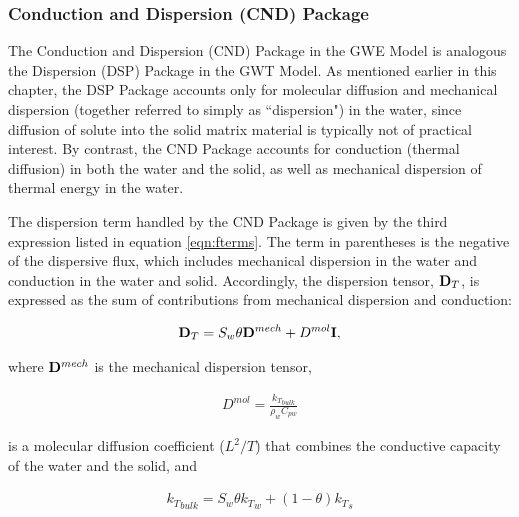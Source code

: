 \subsubsection{Conduction and Dispersion (CND) Package}

The Conduction and Dispersion (CND) Package in the GWE Model is analogous the Dispersion (DSP) Package in the GWT Model. As mentioned earlier in this chapter, the DSP Package accounts only for molecular diffusion and mechanical dispersion (together referred to simply as ``dispersion") in the water, since diffusion of solute into the solid matrix material is typically not of practical interest.  By contrast, the CND Package accounts for conduction (thermal diffusion) in both the water and the solid, as well as mechanical dispersion of thermal energy in the water.

The dispersion term handled by the CND Package is given by the third expression listed in equation \ref{eqn:fterms}. The term in parentheses is the negative of the dispersive flux, which includes mechanical dispersion in the water and conduction in the water and solid. Accordingly, the dispersion tensor, $\mathbf{D}_T$, is expressed as the sum of contributions from mechanical dispersion and conduction:

\begin{equation}
\label{eqn:dt_tensor}
\begin{aligned}
\mathbf{D}_T = S_w \theta \mathbf{D}^{mech} + D^{mol} \mathbf{I},
\end{aligned}
\end{equation}

\noindent where $\mathbf{D}^{mech}$ is the mechanical dispersion tensor,

\begin{equation}
\label{eqn:dmolforheat}
\begin{aligned}
D^{mol} = \frac {{k_T}_{bulk}}{\rho_w C_{pw}}
\end{aligned}
\end{equation}

\noindent is a molecular diffusion coefficient ($L^2/T$) that combines the conductive capacity of the water and the solid, and

\begin{equation}
\label{eqn:ktbulk}
\begin{aligned}
{k_T}_{bulk} = S_w \theta {k_T}_w + \left ( 1 - \theta \right ) {k_T}_s
\end{aligned}
\end{equation}

